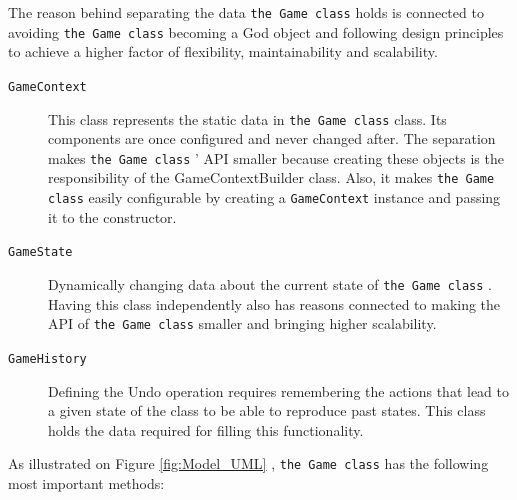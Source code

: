 The reason behind separating the data \texttt{the Game class} holds is connected to avoiding \texttt{the Game class} becoming a God object and following
design principles to achieve a higher factor of flexibility, maintainability and scalability.
\begin{description}
    \item[\texttt{GameContext}] This class represents the static data in \texttt{the Game class} class. Its components are once configured and 
    never changed after. The separation makes \texttt{the Game class} ' API smaller because creating these objects is the responsibility of the GameContextBuilder class.
    Also, it makes \texttt{the Game class} easily configurable by creating a \texttt{GameContext} instance and passing it to the constructor.
    \item[\texttt{GameState}] Dynamically changing data about the current state of \texttt{the Game class} . Having this class independently 
    also has reasons connected to making the API of \texttt{the Game class} smaller and bringing higher scalability.
    \item[\texttt{GameHistory}] Defining the Undo operation requires remembering the actions that lead to a given state of the class to be 
    able to reproduce past states. This class holds the data required for filling this functionality.
\end{description}

As illustrated on Figure \ref{fig:Model_UML} , \texttt{the Game class} has the following most important methods:

